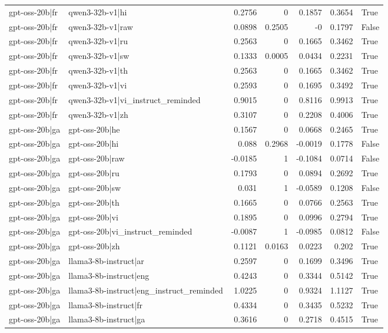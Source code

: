 \begin{table}
\begin{tabular}{l l r r r r l}
gpt-oss-20b|fr & qwen3-32b-v1|hi & 0.2756 & 0 & 0.1857 & 0.3654 & True \\
gpt-oss-20b|fr & qwen3-32b-v1|raw & 0.0898 & 0.2505 & -0 & 0.1797 & False \\
gpt-oss-20b|fr & qwen3-32b-v1|ru & 0.2563 & 0 & 0.1665 & 0.3462 & True \\
gpt-oss-20b|fr & qwen3-32b-v1|sw & 0.1333 & 0.0005 & 0.0434 & 0.2231 & True \\
gpt-oss-20b|fr & qwen3-32b-v1|th & 0.2563 & 0 & 0.1665 & 0.3462 & True \\
gpt-oss-20b|fr & qwen3-32b-v1|vi & 0.2593 & 0 & 0.1695 & 0.3492 & True \\
gpt-oss-20b|fr & qwen3-32b-v1|vi_instruct_reminded & 0.9015 & 0 & 0.8116 & 0.9913 & True \\
gpt-oss-20b|fr & qwen3-32b-v1|zh & 0.3107 & 0 & 0.2208 & 0.4006 & True \\
gpt-oss-20b|ga & gpt-oss-20b|he & 0.1567 & 0 & 0.0668 & 0.2465 & True \\
gpt-oss-20b|ga & gpt-oss-20b|hi & 0.088 & 0.2968 & -0.0019 & 0.1778 & False \\
gpt-oss-20b|ga & gpt-oss-20b|raw & -0.0185 & 1 & -0.1084 & 0.0714 & False \\
gpt-oss-20b|ga & gpt-oss-20b|ru & 0.1793 & 0 & 0.0894 & 0.2692 & True \\
gpt-oss-20b|ga & gpt-oss-20b|sw & 0.031 & 1 & -0.0589 & 0.1208 & False \\
gpt-oss-20b|ga & gpt-oss-20b|th & 0.1665 & 0 & 0.0766 & 0.2563 & True \\
gpt-oss-20b|ga & gpt-oss-20b|vi & 0.1895 & 0 & 0.0996 & 0.2794 & True \\
gpt-oss-20b|ga & gpt-oss-20b|vi_instruct_reminded & -0.0087 & 1 & -0.0985 & 0.0812 & False \\
gpt-oss-20b|ga & gpt-oss-20b|zh & 0.1121 & 0.0163 & 0.0223 & 0.202 & True \\
gpt-oss-20b|ga & llama3-8b-instruct|ar & 0.2597 & 0 & 0.1699 & 0.3496 & True \\
gpt-oss-20b|ga & llama3-8b-instruct|eng & 0.4243 & 0 & 0.3344 & 0.5142 & True \\
gpt-oss-20b|ga & llama3-8b-instruct|eng_instruct_reminded & 1.0225 & 0 & 0.9324 & 1.1127 & True \\
gpt-oss-20b|ga & llama3-8b-instruct|fr & 0.4334 & 0 & 0.3435 & 0.5232 & True \\
gpt-oss-20b|ga & llama3-8b-instruct|ga & 0.3616 & 0 & 0.2718 & 0.4515 & True \\

\end{tabular}
\end{table}

